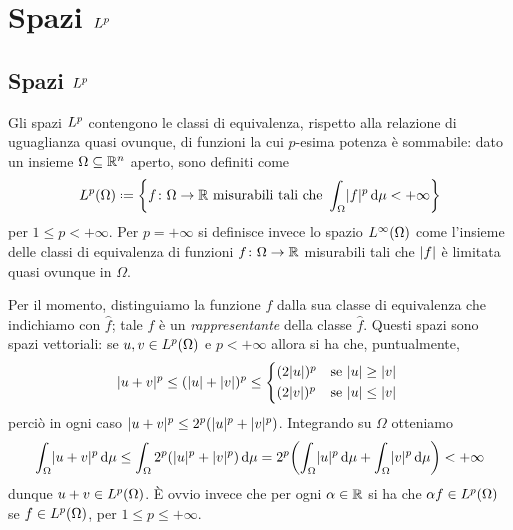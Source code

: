 \chapter{Spazi $\lclass[p]$}
\label{ch:spazi-Lp}

\section{Spazi $\lclass[p]$}
\label{sec:spazi-Lp}
Gli spazi $\lclass[p]$ contengono le classi di equivalenza, rispetto alla relazione di uguaglianza quasi ovunque, di funzioni la cui $p$-esima potenza è sommabile: dato un insieme $\Omega\subseteq\R^n$ aperto, sono definiti come
\begin{equation*}
    \leb[p]{\Omega}\defeq\biggl\{f\colon\Omega\to\R\text{ misurabili tali che }\int_\Omega\abs{f}^p\,\dd\mu<+\infty\biggr\}
\end{equation*}
per $1\le p<+\infty$.
Per $p=+\infty$ si definisce invece lo spazio $\leb[\infty]{\Omega}$ come l'insieme delle classi di equivalenza di funzioni $f\colon\Omega\to\R$ misurabili tali che $\abs{f}$ è limitata quasi ovunque in $\Omega$.

\newcommand{\eqc}[1]{\hat{#1}} %
Per il momento, distinguiamo la funzione $f$ dalla sua classe di equivalenza che indichiamo con $\eqc{f}$; tale $f$ è un \emph{rappresentante} della classe $\eqc{f}$.
Questi spazi sono spazi vettoriali: se $u,v\in\leb[p]{\Omega}$ e $p<+\infty$ allora si ha che, puntualmente, 
\begin{equation}
    \abs{u+v}^p\le(\abs{u}+\abs{v})^p\le
    \begin{cases*}
        (2\abs{u})^p & se $\abs{u}\ge\abs{v}$\\
        (2\abs{v})^p & se $\abs{u}\le\abs{v}$
    \end{cases*}
\end{equation}
perciò in ogni caso $\abs{u+v}^p\le 2^p(\abs{u}^p+\abs{v}^p)$.
Integrando su $\Omega$ otteniamo
\begin{equation}
    \int_\Omega \abs{u+v}^p\,\dd\mu\le
    \int_\Omega 2^p(\abs{u}^p+\abs{v}^p)\,\dd\mu=
    2^p\biggl(\int_\Omega \abs{u}^p\,\dd\mu + \int_\Omega \abs{v}^p\,\dd\mu\biggr)<+\infty
\end{equation}
dunque $u+v\in\leb[p]{\Omega}$.
È ovvio invece che per ogni $\alpha\in\R$ si ha che $\alpha f\in\leb[p]{\Omega}$ se $f\in\leb[p]{\Omega}$, per $1\le p\le+\infty$.


